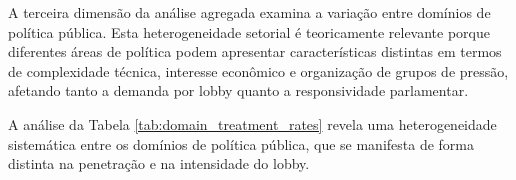 
A terceira dimensão da análise agregada examina a variação entre domínios de política pública. Esta heterogeneidade setorial é teoricamente relevante porque diferentes áreas de política podem apresentar características distintas em termos de complexidade técnica, interesse econômico e organização de grupos de pressão, afetando tanto a demanda por lobby quanto a responsividade parlamentar.


A análise da Tabela \ref{tab:domain_treatment_rates} revela uma heterogeneidade sistemática entre os domínios de política pública, que se manifesta de forma distinta na penetração e na intensidade do lobby.

